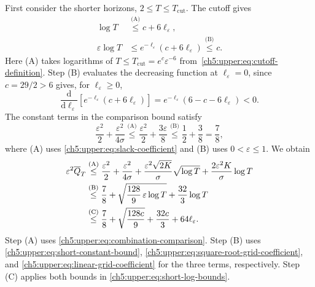 First consider the shorter horizons, $2\le T\le T_{\mathrm{cut}}$. The cutoff gives
\begin{equation}
 \begin{aligned}
 \log T&\overset{\text{(A)}}{\le}c+6\ell_\varepsilon,\\
 \varepsilon\log T
 &\le e^{-\ell_\varepsilon}
   (c+6\ell_\varepsilon)
 \overset{\text{(B)}}{\le}c.
 \end{aligned}
 \label{ch5:upper:eq:short-log-bounds}
\end{equation}
Here (A) takes logarithms of $T\le T_{\mathrm{cut}}=e^c\varepsilon^{-6}$
from~\eqref{ch5:upper:eq:cutoff-definition}.
Step (B) evaluates the decreasing
function at $\ell_\varepsilon=0$, since $c=29/2>6$ gives, for
$\ell_\varepsilon\ge0$,
\[
 \frac{\mathrm d}{\mathrm d\ell_\varepsilon}
 \left[e^{-\ell_\varepsilon}(c+6\ell_\varepsilon)\right]
 =e^{-\ell_\varepsilon}(6-c-6\ell_\varepsilon)<0.
\]
The constant terms in the comparison bound satisfy
\begin{equation}
 \frac{\varepsilon^2}{2}+\frac{\varepsilon^2}{4\sigma}
 \overset{\text{(A)}}{\le}\frac{\varepsilon^2}{2}+\frac{3\varepsilon}{8}
 \overset{\text{(B)}}{\le}\frac12+\frac38=\frac78,
 \label{ch5:upper:eq:short-constant-bound}
\end{equation}
where (A) uses \eqref{ch5:upper:eq:slack-coefficient} and (B) uses
$0<\varepsilon\le1$. We obtain
\begin{align}
\varepsilon^2\overline Q_T
 &\overset{\text{(A)}}{\le}\frac{\varepsilon^2}{2}+\frac{\varepsilon^2}{4\sigma}
 +\frac{\varepsilon^2\sqrt{2K}}{\sigma}\sqrt{\log T}
+\frac{2\varepsilon^2K}{\sigma}\log T\notag\\
&\overset{\text{(B)}}{\le}\frac78+\sqrt{\frac{128}{9}\,\varepsilon\log T}
 +\frac{32}{3}\log T\notag\\
&\overset{\text{(C)}}{\le}\frac78+\sqrt{\frac{128c}{9}}
 +\frac{32c}{3}+64\ell_\varepsilon.
\label{ch5:upper:eq:short-horizon-bound}
\end{align}
Step (A) uses \eqref{ch5:upper:eq:combination-comparison}. Step (B) uses
\eqref{ch5:upper:eq:short-constant-bound},
\eqref{ch5:upper:eq:square-root-grid-coefficient}, and
\eqref{ch5:upper:eq:linear-grid-coefficient} for the three terms,
respectively. Step (C) applies both bounds in
\eqref{ch5:upper:eq:short-log-bounds}.

